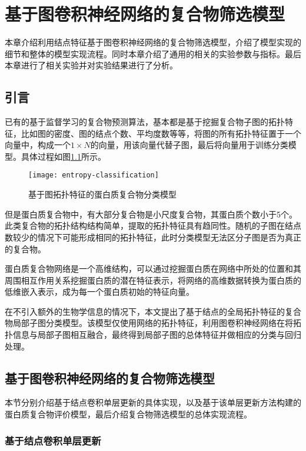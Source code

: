 \chapter{基于图卷积神经网络的复合物筛选模型}
\label{chapter:NodeConv}

本章介绍利用结点特征基于图卷积神经网络的复合物筛选模型，介绍了模型实现的细节和整体的模型实现流程。同时本章介绍了通用的相关的实验参数与指标。最后本章进行了相关实验并对实验结果进行了分析。

\section{引言}
\label{section:NodeConv:Put}

已有的基于监督学习的复合物预测算法，基本都是基于挖掘复合物子图的拓扑特征，比如图的密度、图的结点个数、平均度数等等，将图的所有拓扑特征置于一个向量中，构成一个$1\times N$的向量，用该向量代替子图，最后将向量用于训练分类模型。具体过程如图\ref{fig:entropy-classification}所示。

\begin{figure}[htbp]
    \centering
    \texttt{[image: entropy-classification]}
    \caption{基于图拓扑特征的蛋白质复合物分类模型}
    \label{fig:entropy-classification}
\end{figure}


但是蛋白质复合物中，有大部分复合物是小尺度复合物，其蛋白质个数小于5个。此类复合物的拓扑结构结构简单，提取的拓扑特征具有趋同性。随机的子图在结点数较少的情况下可能形成相同的拓扑特征，此时分类模型无法区分子图是否为真正的复合物。

蛋白质复合物网络是一个高维结构，可以通过挖掘蛋白质在网络中所处的位置和其周围相互作用关系挖掘蛋白质的潜在特征表示，将网络的高维数据转换为蛋白质的低维嵌入表示，成为每一个蛋白质初始的特征向量。

在不引入额外的生物学信息的情况下，本文提出了基于结点的全局拓扑特征的复合物局部子图分类模型。该模型仅使用网络的拓扑特征，利用图卷积神经网络在将拓扑信息与局部子图相互融合，最终得到局部子图的总体特征并做相应的分类与回归处理。

\section{基于图卷积神经网络的复合物筛选模型}
\label{section:NodeConv:detail}

本节分别介绍基于结点卷积单层更新的具体实现，以及基于该单层更新方法构建的蛋白质复合物评价模型，最后介绍复合物筛选模型的总体实现流程。

\subsection{基于结点卷积单层更新}
\label{section:NodeConv:single}

